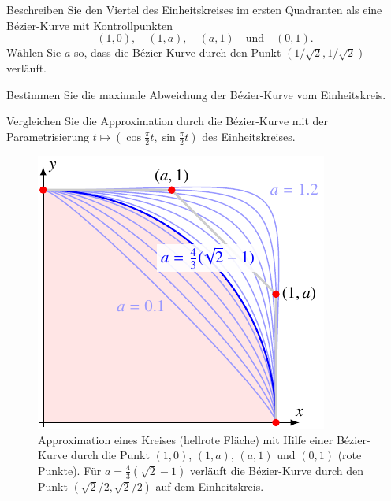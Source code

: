 Beschreiben Sie den Viertel des Einheitskreises im ersten Quadranten
als eine Bézier-Kurve mit Kontrollpunkten 
%
%
\[
(1,0),\quad (1,a), \quad (a,1) \quad\text{und}\quad (0,1).
\]
Wählen Sie $a$ so, dass die Bézier-Kurve durch den Punkt
$(1/\sqrt{2},1/\sqrt{2})$ verläuft.
\begin{teilaufgaben}
\item
Bestimmen Sie die maximale Abweichung der Bézier-Kurve vom Einheitskreis.
%
\item
Vergleichen Sie die Approximation durch die Bézier-Kurve mit
der Parametrisierung $t\mapsto (\cos\frac{\pi}2t,\sin\frac{\pi}2t)$ des
Einheitskreises.
\end{teilaufgaben}
\begin{figure}
\centering
\includegraphics{chapters/30-interpolation/uebungsaufgaben/3003kreis.pdf}
\caption{Approximation eines Kreises (hellrote Fläche) mit Hilfe einer
Bézier-Kurve durch die Punkt $(1,0)$, $(1,a)$, $(a,1)$ und $(0,1)$ (rote
Punkte).
Für $a=\frac43(\!\sqrt{2}-1)$ verläuft die Bézier-Kurve durch den 
Punkt $(\sqrt{2}/2,\sqrt{2}/2)$ auf dem Einheitskreis.
\label{3003:figure:kreis}}
\end{figure}

